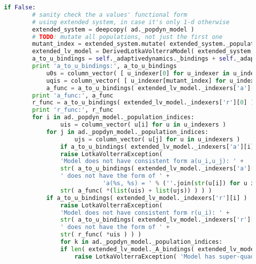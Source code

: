 \begin{lstlisting}[language=Python]
	if False:
	    # sanity check the a values' functional form
	    # using extended system, in case it's only 1-d otherwise
	    extended_system = deepcopy( ad._popdyn_model )
	    # TODO: mutate all populations, not just the first one
	    mutant_index = extended_system.mutate( extended_system._population_indices[0] )
	    extended_lv_model = DerivedLotkaVolterraModel( extended_system, r_name=r_name, a_name=a_name )
	    a_to_u_bindings = self._adaptivedynamics._bindings + self._adaptivedynamics._late_bindings + extended_lv_model._A_bindings
	    print 'a_to_u_bindings:', a_to_u_bindings
            u0s = column_vector( [ u_indexer[0] for u_indexer in u_indexers ] )
            uqis = column_vector( [ u_indexer[mutant_index] for u_indexer in u_indexers ] )
            a_func = a_to_u_bindings( extended_lv_model._indexers['a'][0][mutant_index] ).function( *(list(u0s) + list(uqis)) )
	    print 'a_func:', a_func
	    r_func = a_to_u_bindings( extended_lv_model._indexers['r'][0] ).function( *u0s )
	    print 'r_func:', r_func
	    for i in ad._popdyn_model._population_indices:
                uis = column_vector( u[i] for u in u_indexers )
	        for j in ad._popdyn_model._population_indices:
                    ujs = column_vector( u[j] for u in u_indexers )
	            if a_to_u_bindings( extended_lv_model._indexers['a'][i][j] ) != a_func( *(list(uis)+list(ujs)) ):
		        raise LotkaVolterraException(
			    'Model does not have consistent form a(u_i,u_j): ' +
			    str( a_to_u_bindings( extended_lv_model._indexers['a'][i][j] ) ) +
			    ' does not have the form of ' +
                            'a(%s, %s) = ' % (''.join(str(u[i]) for u in u_indexers), ''.join(str(u[j]) for u in u_indexers)) +
			    str( a_func( *(list(uis) + list(ujs)) ) ) )
		    if a_to_u_bindings( extended_lv_model._indexers['r'][i] ) != r_func( *uis ):
		        raise LotkaVolterraException(
			    'Model does not have consistent form r(u_i): ' +
			    str( a_to_u_bindings( extended_lv_model._indexers['r'][i] ) ) +
			    ' does not have the form of ' +
			    str( r_func( *uis ) ) )
	            for k in ad._popdyn_model._population_indices:
		        if len( extended_lv_model._A_bindings( extended_lv_model._indexers['a'][i][j] ).coefficients( extended_lv_model._population_indexer[k] ) ) > 1:
		            raise LotkaVolterraException( 'Model has super-quadratic terms in population variables' )



\end{lstlisting}
